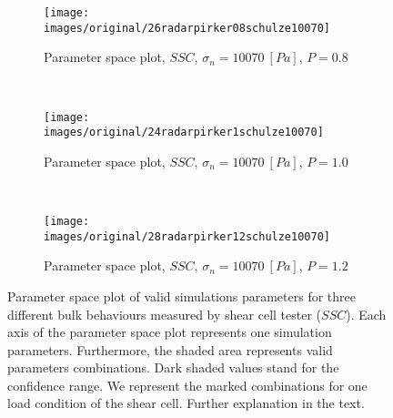 \begin{figure}[htp] \centering
        \begin{subfigure}[b]{0.5\columnwidth}
        \texttt{[image: images/original/26radarpirker08schulze10070]}
        \caption{Parameter space plot, $SSC$, $\sigma_n=10070 ~[Pa]$, $P=0.8$}
        \label{fig:26radarpirker08schulze10070} 
    \end{subfigure}\\
     \begin{subfigure}[b]{0.5\columnwidth}
        \texttt{[image: images/original/24radarpirker1schulze10070]}
        \caption{Parameter space plot, $SSC$, $\sigma_n=10070 ~[Pa]$, $P=1.0$}
        \label{fig:24radarpirker1schulze10070}
    \end{subfigure} \\
        \begin{subfigure}[b]{0.5\columnwidth}
        \texttt{[image: images/original/28radarpirker12schulze10070]}
        \caption{Parameter space plot, $SSC$, $\sigma_n=10070 ~[Pa]$, $P=1.2$}
        \label{fig:28radarpirker12schulze10070} 
    \end{subfigure}
    \caption[Parameter space plot of valid simulations parameters for three different
    bulk behaviours measured by SCT]{Parameter space plot of valid simulations
    parameters for three different bulk behaviours measured by shear cell tester ($SSC$).
    Each axis of the parameter space plot represents one simulation parameters.
    Furthermore, the shaded area represents valid parameters combinations.
    Dark shaded values stand for the confidence range.
    We represent the marked combinations for one load condition of the shear
    cell.
    Further explanation in the text.
   }
    \label{fig:29schulzeradarandcloud}
\end{figure}